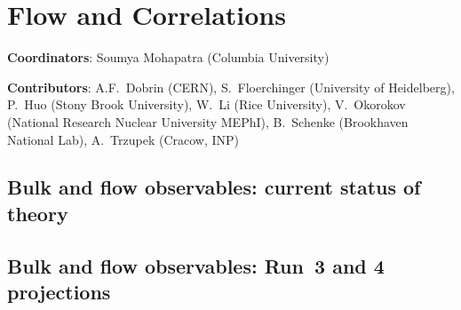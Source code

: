 \documentclass[../report.tex]{subfiles}
\providecommand{\main}{..}
\begin{document}
\section{Flow and Correlations}
\label{sec:flow}

{ \small
\noindent \textbf{Coordinators}: Soumya Mohapatra (Columbia University)

\noindent \textbf{Contributors}: 
A.F.~Dobrin (CERN), 
S.~Floerchinger (University of Heidelberg), 
P.~Huo (Stony Brook University), 
W.~Li (Rice University), 
V.~Okorokov (National Research Nuclear University MEPhI), 
B.~Schenke (Brookhaven National Lab), 
A.~Trzupek (Cracow, INP)
}

\subsection{Bulk and flow observables: current status of theory}
\FloatBarrier
\subsection{Bulk and flow observables: Run~3 and 4 projections}
\FloatBarrier
\FloatBarrier
\FloatBarrier
\FloatBarrier
\FloatBarrier
\end{document}
